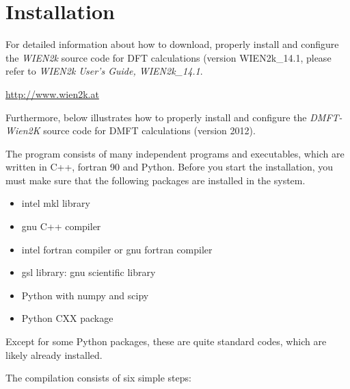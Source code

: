 \documentclass[12 pt]{article}
\begin{document}
  \part{Installation}

  \bigskip
  For detailed information about how to download, properly install and configure the \emph{WIEN2k} source code for 
DFT calculations (version WIEN2k\_14.1, please refer to \emph{WIEN2k User's Guide, WIEN2k\_14.1}. 

  \url{http://www.wien2k.at}

  Furthermore, below illustrates how to properly install and configure the \emph{DMFT-Wien2K} source code for DMFT 
calculations (version 2012). 

  The program consists of many independent programs and executables, which are written in C++, fortran 90 and Python. 
Before you start the installation, you must make sure that the following packages are installed in the system.

{\color{cyan}
  \begin{itemize}

  \item intel mkl library

  \item gnu C++ compiler

  \item intel fortran compiler or gnu fortran compiler

  \item gsl library: gnu scientific library

  \item Python with numpy and scipy

  \item Python CXX package

  \end{itemize}
}

  Except for some Python packages, these are quite standard codes, which are likely already installed.

  The compilation consists of six simple steps:
\end{document}
